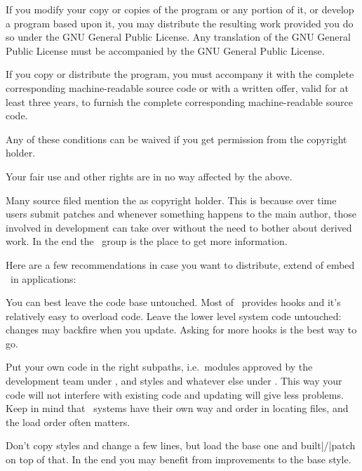 If you modify your copy or copies of the program or any portion of it, or develop
a program based upon it, you may distribute the resulting work provided you do so
under the GNU General Public License. Any translation of the GNU General Public
License must be accompanied by the GNU General Public License.

If you copy or distribute the program, you must accompany it with the complete
corresponding machine-readable source code or with a written offer, valid for at
least three years, to furnish the complete corresponding machine-readable source
code.

Any of these conditions can be waived if you get permission from the copyright
holder.

Your fair use and other rights are in no way affected by the above.
\stopcolor

Many source filed mention the  as
copyright holder. This is because over time users submit patches and whenever
something happens to the main author, those involved in development can take
over without the need to bother about derived work. In the end the \CONTEXT\
group is the place to get more information.

\stopsubject

\startsubject[title={Recommendations}]

Here are a few recommendations in case you want to distribute, extend of embed
\CONTEXT\ in applications:

\startitemize

\startitem
    You can best leave the code base untouched. Most of \CONTEXT\ provides hooks
    and it's relatively easy to overload code. Leave the lower level system code
    untouched: changes may backfire when you update. Asking for more hooks is the
    best way to go.
\stopitem

\startitem
    Put your own code in the right subpaths, i.e.\ modules approved by the
    development team under \type {.../third}, and styles and whatever else under
    \type {.../user}. This way your code will not interfere with existing code
    and updating will give less problems. Keep in mind that \TEX\ systems have
    their own way and order in locating files, and the load order often matters.
\stopitem

\startitem
    Don't copy styles and change a few lines, but load the base one and
    built|/|patch on top of that. In the end you may benefit from improvements to
    the base style.
\stopitem


